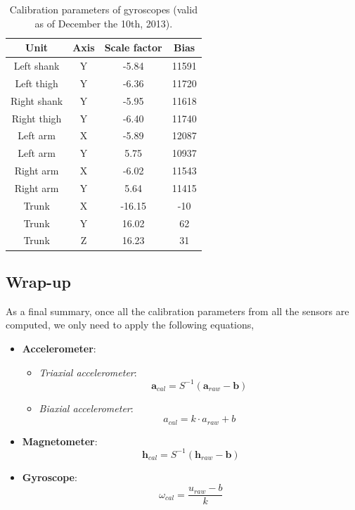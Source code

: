 \begin{table}[H]\footnotesize
\caption{Calibration parameters of gyroscopes (valid as of December the 10th, 2013).}
	\centering
		\begin{tabular}{|c|c|c|c|}\hline
		\label{tab:gyro_cal_params}
		Unit				& Axis 	& Scale factor 	& Bias 	\\ \hline
		Left shank 	& Y			& -5.84					& 11591 \\
		Left thigh	& Y			& -6.36					& 11720 \\
		Right shank & Y			& -5.95					& 11618 \\
		Right thigh & Y			& -6.40					& 11740 \\ 
		Left arm	  & X			& -5.89					& 12087 \\
		Left arm		& Y			& 5.75					& 10937 \\
		Right arm   & X			& -6.02					& 11543 \\
		Right arm   & Y			& 5.64					& 11415 \\ 
		Trunk				& X			& -16.15				& -10		\\
		Trunk				& Y			& 16.02					& 62		\\	
		Trunk				& Z			& 16.23					& 31		\\
		\hline
		\end{tabular}
\end{table}

\subsection{Wrap-up}
\label{subsec:cal_wrapup}
\indent \indent As a final summary, once all the calibration parameters from all the sensors are computed, we only need to apply the following equations,

\begin{itemize}
\item \textbf{Accelerometer}:
	\begin{itemize}
	\item \textit{Triaxial accelerometer}:
		\begin{equation}
		\label{eq:cal_acceleration_summary}
		\mathbf{a}_{cal}=S^{-1}(\mathbf{a}_{raw}-\mathbf{b})
		\end{equation}
	\item \textit{Biaxial accelerometer}:
		\begin{equation}
		\label{eq:acc_1D_cal_equation_summary}
		a_{cal} = k\cdot a_{raw} + b
		\end{equation}
	\end{itemize}
\item \textbf{Magnetometer}:
	\begin{equation}
	\label{eq:cal_mag_summary}
	\mathbf{h}_{cal}=S^{-1}(\mathbf{h}_{raw}-\mathbf{b})
	\end{equation}
\item \textbf{Gyroscope}:
\begin{equation}
\label{eq:gyro_cal2_summary}
\omega_{cal} = \frac{u_{raw}-b}{k} 
\end{equation}
\end{itemize}